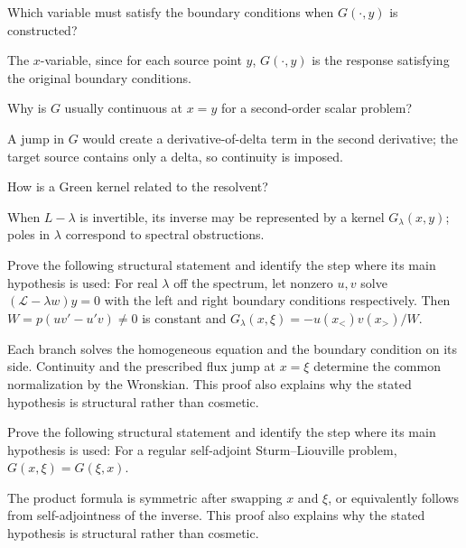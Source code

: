 \begin{problem}\label{prob:iii26-problem-06}
Which variable must satisfy the boundary conditions when \(G(\cdot,y)\) is constructed?
\end{problem}
\begin{solution}
The \(x\)-variable, since for each source point \(y\), \(G(\cdot,y)\) is
the response satisfying the original boundary conditions.
\end{solution}

\begin{problem}\label{prob:iii26-problem-07}
Why is \(G\) usually continuous at \(x=y\) for a second-order scalar problem?
\end{problem}
\begin{solution}
A jump in \(G\) would create a derivative-of-delta term in the second
derivative; the target source contains only a delta, so continuity is imposed.
\end{solution}

\begin{problem}\label{prob:iii26-problem-08}
How is a Green kernel related to the resolvent?
\end{problem}
\begin{solution}
When \(L-\lambda\) is invertible, its inverse may be represented by a
kernel \(G_\lambda(x,y)\); poles in \(\lambda\) correspond to spectral
obstructions.
\end{solution}

\begin{problem}\label{prob:iii26-problem-09}
Prove the following structural statement and identify the step where its main hypothesis is used: For real $\lambda$ off the spectrum, let nonzero $u,v$ solve $(\mathcal L-\lambda w)y=0$ with the left and right boundary conditions respectively. Then $W=p(uv'-u' v)\ne0$ is constant and $G_\lambda(x,\xi)=-u(x_<)v(x_>)/W$.
\end{problem}
\begin{solution}
Each branch solves the homogeneous equation and the boundary condition on its side. Continuity and the prescribed flux jump at $x=\xi$ determine the common normalization by the Wronskian. This proof also explains why the stated hypothesis is structural rather than cosmetic.
\end{solution}

\begin{problem}[Symmetry]\label{prob:iii26-problem-10}
Prove the following structural statement and identify the step where its main hypothesis is used: For a regular self-adjoint Sturm--Liouville problem, $G(x,\xi)=G(\xi,x)$.
\end{problem}
\begin{solution}
The product formula is symmetric after swapping $x$ and $\xi$, or equivalently follows from self-adjointness of the inverse. This proof also explains why the stated hypothesis is structural rather than cosmetic.
\end{solution}

